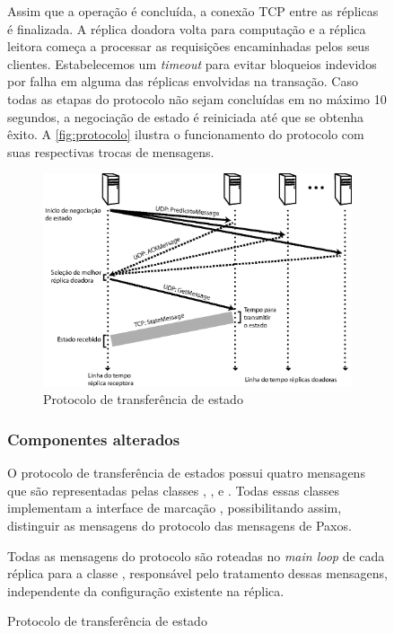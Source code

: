 \begin{figure}[ht]
Assim que a operação é concluída, a conexão TCP entre as réplicas é finalizada. A réplica
doadora volta para computação e a réplica leitora começa a processar as requisições
encaminhadas pelos seus clientes. Estabelecemos um \emph{timeout} para evitar bloqueios
indevidos por falha em alguma das réplicas envolvidas na transação. Caso todas as etapas
do protocolo não sejam concluídas em no máximo 10 segundos, a negociação de estado é
reiniciada até que se obtenha êxito. A \autoref{fig:protocolo} ilustra o funcionamento do
protocolo com suas respectivas trocas de mensagens.

\begin{figure}[ht]
  \centering
  \includegraphics[width=11cm]{conteudo/capitulos/figuras/transferencia_estado.eps}
  \caption{Protocolo de transferência de estado}
  \label{fig:protocolo}
\end{figure}

\subsubsection{Componentes alterados}

O protocolo de transferência de estados possui quatro mensagens que são representadas
pelas classes , ,  e
. Todas essas classes implementam a interface de marcação
, possibilitando assim, distinguir as mensagens do
protocolo das mensagens de Paxos.

Todas as mensagens do protocolo são roteadas no \emph{main loop} de cada réplica para a
classe , responsável pelo tratamento dessas mensagens, independente da
configuração existente na réplica.



\end{figure}
